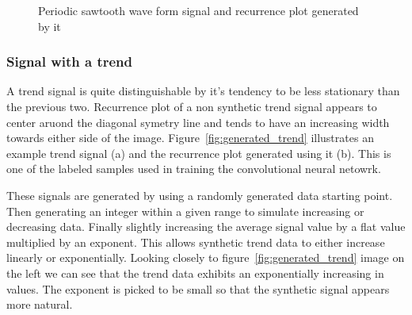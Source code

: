 \documentclass[a4paper,12pt,fleqn]{article}
\begin{document}
\begin{figure}
  \centering
  \qquad
  \caption{Periodic sawtooth wave form signal and recurrence plot generated by it}
  \label{fig:generated_periodic_sawtooth}
\end{figure}


\subsubsection{Signal with a trend}
A trend signal is quite distinguishable by it's tendency to be less stationary than the previous two.
Recurrence plot of a non synthetic trend signal appears to center aruond the diagonal symetry line and tends to have an increasing width towards either side of the image.
Figure~\ref{fig:generated_trend} illustrates an example trend signal (a) and the recurrence plot generated using it (b).
This is one of the labeled samples used in training the convolutional neural netowrk.

These signals are generated by using a randomly generated data starting point. Then generating an integer within a given range to simulate increasing or decreasing data.
Finally slightly increasing the average signal value by a flat value multiplied by an exponent.
This allows synthetic trend data to either increase linearly or exponentially.
Looking closely to figure~\ref{fig:generated_trend} image on the left we can see that the trend data exhibits an exponentially increasing in values.
The exponent is picked to be small so that the synthetic signal appears more
natural.
\end{document}
